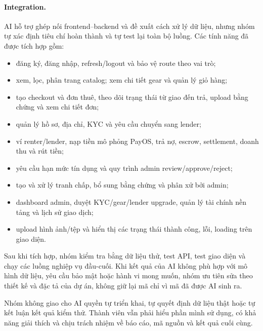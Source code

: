 \paragraph{Integration.}
AI hỗ trợ ghép nối frontend--backend và đề xuất cách xử lý dữ liệu, nhưng nhóm
tự xác định tiêu chí hoàn thành và tự test lại toàn bộ luồng. Các tính năng đã
được tích hợp gồm:
\begin{itemize}
    \item đăng ký, đăng nhập, refresh/logout và bảo vệ route theo vai trò;
    \item xem, lọc, phân trang catalog; xem chi tiết gear và quản lý giỏ hàng;
    \item tạo checkout và đơn thuê, theo dõi trạng thái từ giao đến trả,
    upload bằng chứng và xem chi tiết đơn;
    \item quản lý hồ sơ, địa chỉ, KYC và yêu cầu chuyển sang lender;
    \item ví renter/lender, nạp tiền mô phỏng PayOS, trả nợ, escrow,
    settlement, doanh thu và rút tiền;
    \item yêu cầu hạn mức tín dụng và quy trình admin review/approve/reject;
    \item tạo và xử lý tranh chấp, bổ sung bằng chứng và phân xử bởi admin;
    \item dashboard admin, duyệt KYC/gear/lender upgrade, quản lý tài chính
    nền tảng và lịch sử giao dịch;
    \item upload hình ảnh/tệp và hiển thị các trạng thái thành công, lỗi,
    loading trên giao diện.
\end{itemize}

Sau khi tích hợp, nhóm kiểm tra bằng dữ liệu thử, test API, test giao diện và
chạy các luồng nghiệp vụ đầu-cuối. Khi kết quả của AI không phù hợp với mô
hình dữ liệu, yêu cầu bảo mật hoặc hành vi mong muốn, nhóm ưu tiên sửa theo
thiết kế và đặc tả của dự án, không giữ lại mã chỉ vì mã đã được AI sinh ra.

Nhóm không giao cho AI quyền tự triển khai, tự quyết định dữ liệu thật hoặc tự kết luận kết quả kiểm
thử. Thành viên vẫn phải hiểu phần mình sử dụng, có khả năng giải thích và
chịu trách nhiệm về báo cáo, mã nguồn và kết quả cuối cùng.
